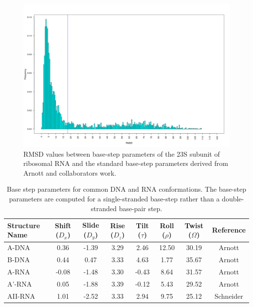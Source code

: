 \begin{figure}
 \centering
\includegraphics[angle=0, scale=0.3]{Chapter2/dormsd.png}
\caption{RMSD values between base-step parameters of the 23S subunit of
  ribosomal RNA and the standard base-step parameters derived from
  Arnott and collaborators \cite{arnott1973} work.}
 \label{fig:dormsd}
\end{figure}

\begin{table}
\begin{center}
{\small
\begin{tabular}{p{2cm}|c|c|c|c|c|c|c}
\hline
\textbf{Structure Name} & Shift ($D_x$) & Slide ($D_y$) & Rise ($D_z$) & Tilt
($\tau$) & Roll ($\rho$) & Twist ($\Omega$) & \textbf{Reference} \\ \hline
A-DNA & 0.36 & -1.39 & 3.29 & 2.46 & 12.50 & 30.19 & Arnott \cite{arnott1999} \\ \hline
B-DNA & 0.44 & 0.47 & 3.33 & 4.63 & 1.77 & 35.67   & Arnott \cite{arnott1999} \\ \hline
A-RNA & -0.08 & -1.48 & 3.30 & -0.43 & 8.64 & 31.57 & Arnott \cite{arnott1999} \\ \hline
A'-RNA & 0.05 & -1.88 & 3.39 & -0.12 & 5.43 & 29.52 & Arnott \cite{arnott1999} \\ \hline
AII-RNA & 1.01 & -2.52 & 3.33 & 2.94 & 9.75 & 25.12 & Schneider \cite{schneider2004} \\ \hline
\end{tabular}
}
\caption{Base step parameters for common DNA and RNA
  conformations. The base-step parameters are computed for
  a single-stranded base-step rather than a double-stranded base-pair step.}
\end{center}
\label{tab:conformations}
\end{table}

